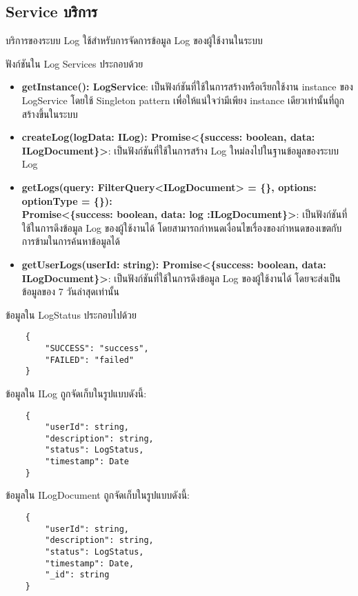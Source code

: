 \subsection{\ifenglish Service \else บริการ \fi}

\ifenglish
\else
บริการของระบบ Log ใช้สำหรับการจัดการข้อมูล Log ของผู้ใช้งานในระบบ 

ฟังก์ชันใน Log Services ประกอบด้วย
\begin{itemize}
    \item \textbf{getInstance(): LogService}: เป็นฟังก์ชันที่ใช้ในการสร้างหรือเรียกใช้งาน instance ของ \\LogService โดยใช้ Singleton pattern เพื่อให้แน่ใจว่ามีเพียง instance เดียวเท่านั้นที่ถูกสร้างขึ้นในระบบ
    \item \textbf{createLog(logData: ILog): Promise<\{success: boolean, data: ILogDocument\}>}: เป็นฟังก์ชันที่ใช้ในการสร้าง Log ใหม่ลงไปในฐานข้อมูลของระบบ Log
    \item \textbf{getLogs(query: FilterQuery<ILogDocument> = \{\}, options: optionType = \{\}): \\Promise<\{success: boolean, data: log :ILogDocument\}>}: เป็นฟังก์ชันที่ใช้ในการดึงข้อมูล Log ของผู้ใช้งานได้ โดยสามารถกำหนดเงื่อนไขเรื่องของกำหนดของเขตกับการข้ามในการค้นหาข้อมูลได้
    \item \textbf{getUserLogs(userId: string): Promise<\{success: boolean, data: ILogDocument\}>}: เป็นฟังก์ชันที่ใช้ในการดึงข้อมูล Log ของผู้ใช้งานได้ โดยจะส่งเป็นข้อมูลของ 7 วันล่าสุดเท่านั้น
\end{itemize}

ข้อมูลใน LogStatus ประกอบไปด้วย
\begin{lstlisting}
    {
        "SUCCESS": "success",
        "FAILED": "failed"
    }
\end{lstlisting}

ข้อมูลใน ILog ถูกจัดเก็บในรูปแบบดังนี้:
\begin{lstlisting}
    {
        "userId": string,
        "description": string,
        "status": LogStatus,
        "timestamp": Date
    }
\end{lstlisting}

ข้อมูลใน ILogDocument ถูกจัดเก็บในรูปแบบดังนี้:
\begin{lstlisting}
    {
        "userId": string,
        "description": string,
        "status": LogStatus,
        "timestamp": Date,
        "_id": string
    }
\end{lstlisting}
\fi